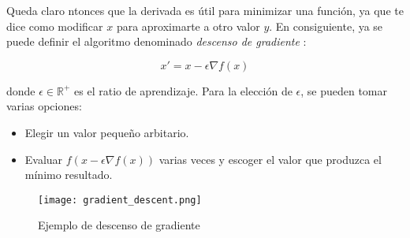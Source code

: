 Queda claro ntonces que la derivada es útil para minimizar una
función, ya que te dice como modificar $x$ para aproximarte a otro valor $y$. En consiguiente, ya se puede
definir el algoritmo denominado \textit{descenso de gradiente} \cite{lemarechal2012cauchy}:

\[
    x'=x-\epsilon\nabla f(x)
\]

donde $\epsilon\in\mathbb{R}^+$ es el ratio de aprendizaje. Para la elección de $\epsilon$, se pueden tomar
varias opciones:

\begin{itemize}
    \item Elegir un valor pequeño arbitario.
    \item Evaluar $f(x-\epsilon\nabla f(x))$ varias veces y escoger el valor que produzca el mínimo resultado.
\end{itemize}
\begin{figure}[H]
    \texttt{[image: gradient\_descent.png]}
    \centering
    \caption{Ejemplo de descenso de gradiente}
\end{figure}